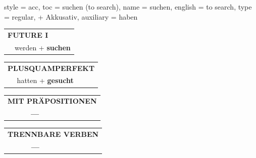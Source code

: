 \begin{verbentry}{
  style = {acc},
  toc = {suchen (to search)},
  name = {suchen},
  english = {to search},
  type = {regular, + Akkusativ},
  auxiliary = {haben}
}
\begin{tabular}{rl}
    \multicolumn{2}{l}{\textbf{FUTURE I} }\\
   & werden + \textbf{suchen}\\
 
  \end{tabular}
\hfill
   \begin{tabular}{rl}
      \multicolumn{2}{l}{\textbf{PLUSQUAMPERFEKT}}\\
   & hatten + \textbf{gesucht}\\
  \end{tabular}
  
  
\vspace{10pt}

\begin{tabular}{lll}
\multicolumn{3}{l}{\textbf{MIT PRÄPOSITIONEN}}\\
& \textbf{---} & \\
\end{tabular}
\hfill
\begin{tabular}{lll}
\multicolumn{3}{l}{\textbf{TRENNBARE VERBEN}}\\
& \textbf{---} & \\
\end{tabular}
\vspace{-5pt}
\end{verbentry}
